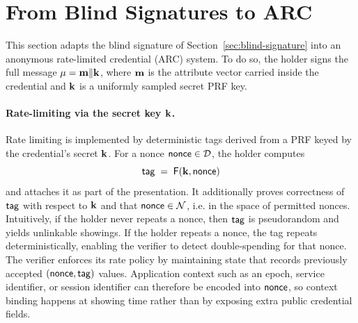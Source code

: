\section{From Blind Signatures to ARC}
\label{sec:arc-construction}

This section adapts the blind signature of Section~\ref{sec:blind-signature} into an anonymous
rate-limited credential (ARC) system. To do so, the holder signs the full message
\(\mathbf{\mu}=\mathbf{m}\Vert \mathbf{k}\), where \(\mathbf{m}\) is the attribute vector carried inside the credential and \(\mathbf{k}\) is a
uniformly sampled secret PRF key.

\paragraph{Rate-limiting via the secret key \(\mathbf{k}\).}
Rate limiting is implemented by deterministic tags derived from a PRF keyed by the credential’s secret
\(\mathbf{k}\). For a nonce \(\mathsf{nonce}\in\mathcal{D}\), the holder computes
\[
\mathsf{tag} \;=\; \mathsf{F}(\mathbf{k},\mathsf{nonce})
\]
and attaches it as part of the presentation. It additionally proves correctness of \(\mathsf{tag}\) with respect to
\(\mathbf{k}\) and that \(\mathsf{nonce} \in \mathcal{N}\), i.e. in the space of permitted nonces. Intuitively, if the holder never
repeats a nonce, then \(\mathsf{tag}\) is pseudorandom and yields unlinkable showings. If the holder repeats a nonce, the
tag repeats deterministically, enabling the verifier to detect double-spending for that nonce. The verifier enforces
its rate policy by maintaining state that records previously accepted \((\mathsf{nonce},\mathsf{tag})\) values. Application context
such as an epoch, service identifier, or session identifier can therefore be encoded into \(\mathsf{nonce}\), so context
binding happens at showing time rather than by exposing extra public credential fields.

